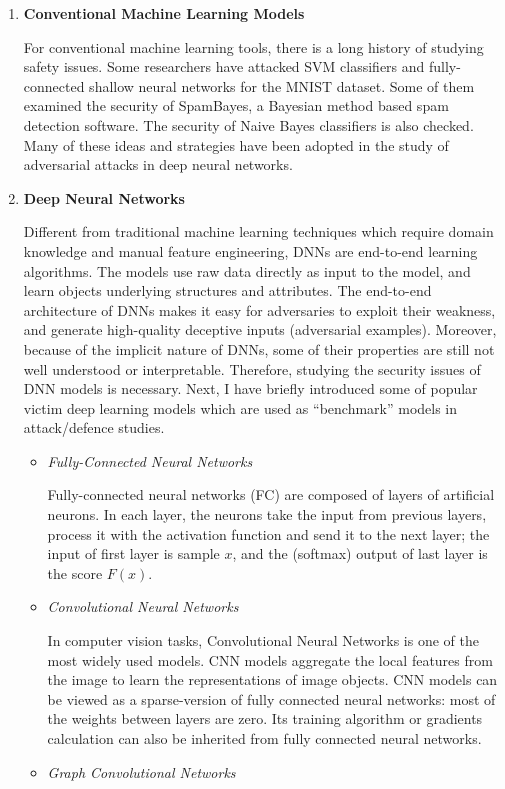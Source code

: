             \begin{enumerate}
                \item \textbf{Conventional Machine Learning Models}
                
                For conventional machine learning tools, there is a long history of studying safety issues. Some researchers have attacked SVM classifiers and fully-connected shallow neural networks for the MNIST dataset. Some of them examined the security of SpamBayes, a Bayesian method based spam detection software. The security of Naive Bayes classifiers is also checked. Many of these ideas and strategies have been adopted in the study of adversarial attacks in deep neural networks.
                \item \textbf{Deep Neural Networks}
                
                Different from traditional machine learning techniques which require domain knowledge and manual feature engineering, DNNs are end-to-end learning algorithms. The models use raw data directly as input to the model, and learn objects underlying structures and attributes. The end-to-end architecture of DNNs makes it easy for adversaries to exploit their weakness, and generate high-quality deceptive inputs (adversarial examples). Moreover, because of the implicit nature of DNNs, some of their properties are still not well understood or interpretable. Therefore, studying the security issues of DNN models is necessary. Next, I have briefly introduced some of popular victim deep learning models which are used as “benchmark” models in attack/defence studies.
                    \begin{itemize}
                        \item \textit{Fully-Connected Neural Networks}
                        
                        Fully-connected neural networks (FC) are composed of layers of artificial neurons. In each layer, the neurons take the input from previous layers, process it with the activation function and send it to the next layer; the input of first layer is sample $x$, and the (softmax) output of last layer is the score $F(x)$.
                        \item \textit{Convolutional Neural Networks}		
                        
                        In computer vision tasks, Convolutional Neural Networks is one of the most widely used models. CNN models aggregate the local features from the image to learn the representations of image objects. CNN models can be viewed as a sparse-version of fully connected neural networks: most of the weights between layers are zero. Its training algorithm or gradients calculation can also be inherited from fully connected neural networks.
                        \item \textit{Graph Convolutional Networks}
                        

\end{itemize}
\end{enumerate}
